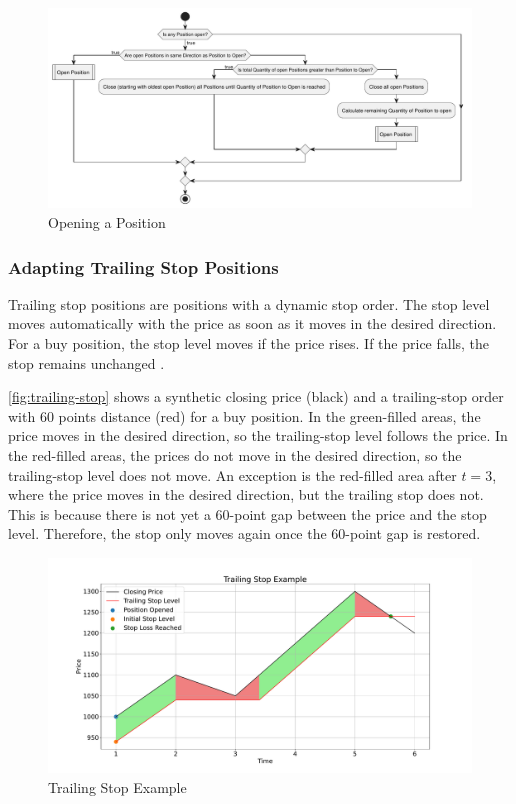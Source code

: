 \begin{figure}[H]
    \centering
    \includegraphics[width=\textwidth]{images/trading-engine/complete-position-opening}
    \caption{Opening a Position}
    \label{fig:te-complete-position-opening}
\end{figure}

\subsubsection{Adapting Trailing Stop Positions}

Trailing stop positions are positions with a dynamic stop order.
The stop level moves automatically with the price as soon as it moves in the desired direction.
For a buy position, the stop level moves if the price rises.
If the price falls, the stop remains unchanged \cite{ig-trailing}.

\autoref{fig:trailing-stop} shows a synthetic closing price (black) and a trailing-stop order with 60 points distance (red) for a buy position.
In the green-filled areas, the price moves in the desired direction, so the trailing-stop level follows the price.
In the red-filled areas, the prices do not move in the desired direction, so the trailing-stop level does not move.
An exception is the red-filled area after $t=3$, where the price moves in the desired direction, but the trailing stop does not.
This is because there is not yet a 60-point gap between the price and the stop level.
Therefore, the stop only moves again once the 60-point gap is restored.

\begin{figure}[H]
    \centering
    \includegraphics[width=\textwidth]{images/trading-engine/trailing-stop}
    \caption{Trailing Stop Example}
    \label{fig:trailing-stop}
\end{figure}
